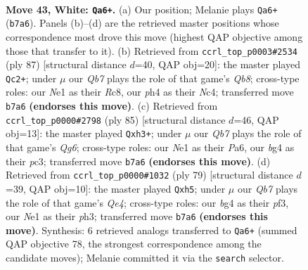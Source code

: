 \documentclass[11pt]{article}
\begin{document}
\clearpage

\begin{figure}[p]\centering
\begin{subfigure}{0.46\textwidth}\centering
\resizebox{\linewidth}{!}{%
\newchessgame
\chessboard[
  setfen={n6r/1Q6/7k/1p6/6bp/P2P4/7K/4Nq2 w - - 0 43},
  showmover=false,
  pgfstyle=straightmove, color=movearrow, markmove={b7-a6}
]}
\caption{}
\end{subfigure}\hfill
\begin{subfigure}{0.46\textwidth}\centering
\resizebox{\linewidth}{!}{%
\newchessgame
\chessboard[
  setfen={2r4k/3Q1p2/8/4p3/2n5/1NP2PR1/7K/1q6 b - - 3 44},
  showmover=false,
  pgfstyle=straightmove, color=movearrow, markmove={b1-c2}
]}
\caption{}
\end{subfigure}
\\[4pt]
\begin{subfigure}{0.46\textwidth}\centering
\resizebox{\linewidth}{!}{%
\newchessgame
\chessboard[
  setfen={8/Q7/p7/6p1/8/P1P3qP/8/k4K2 b - - 3 43},
  showmover=false,
  pgfstyle=straightmove, color=movearrow, markmove={g3-h3}
]}
\caption{}
\end{subfigure}\hfill
\begin{subfigure}{0.46\textwidth}\centering
\resizebox{\linewidth}{!}{%
\newchessgame
\chessboard[
  setfen={6k1/2p5/7p/3Pq2N/8/5P1P/3Q4/7K b - - 0 40},
  showmover=false,
  pgfstyle=straightmove, color=movearrow, markmove={e5-h5}
]}
\caption{}
\end{subfigure}
\caption{\textbf{Move 43, White: \texttt{Qa6+}.} (a) Our position; Melanie plays \texttt{Qa6+} (\texttt{b7a6}). Panels (b)--(d) are the retrieved master positions whose correspondence most drove this move (highest QAP objective among those that transfer to it). (b) Retrieved from \texttt{ccrl\_top\_p0003\#2534} (ply 87) [structural distance $d$=40, QAP obj=20]: the master played \texttt{Qc2+}; under $\mu$ our \emph{Qb7} plays the role of that game's \emph{Qb8}; cross-type roles: our \emph{N}e1 as their \emph{R}c8, our \emph{p}h4 as their \emph{N}c4; transferred move \texttt{b7a6} \textbf{(endorses this move)}. (c) Retrieved from \texttt{ccrl\_top\_p0000\#2798} (ply 85) [structural distance $d$=46, QAP obj=13]: the master played \texttt{Qxh3+}; under $\mu$ our \emph{Qb7} plays the role of that game's \emph{Qg6}; cross-type roles: our \emph{N}e1 as their \emph{P}a6, our \emph{b}g4 as their \emph{p}c3; transferred move \texttt{b7a6} \textbf{(endorses this move)}. (d) Retrieved from \texttt{ccrl\_top\_p0000\#1032} (ply 79) [structural distance $d$=39, QAP obj=10]: the master played \texttt{Qxh5}; under $\mu$ our \emph{Qb7} plays the role of that game's \emph{Qe4}; cross-type roles: our \emph{b}g4 as their \emph{p}f3, our \emph{N}e1 as their \emph{p}h3; transferred move \texttt{b7a6} \textbf{(endorses this move)}. Synthesis: 6 retrieved analogs transferred to \texttt{Qa6+} (summed QAP objective 78, the strongest correspondence among the candidate moves); Melanie committed it via the \texttt{search} selector.}
\label{fig:thought-m84}
\end{figure}
\end{document}
